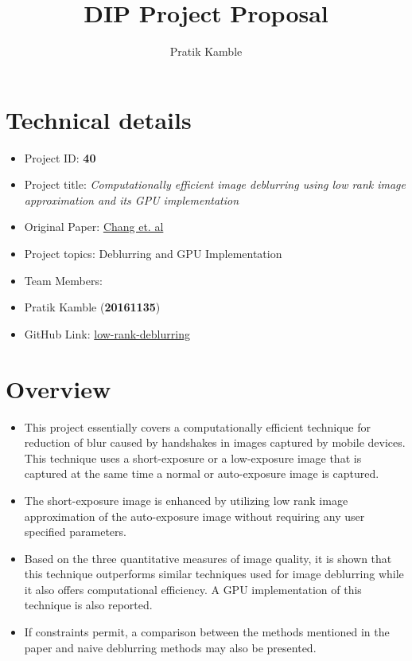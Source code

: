 
\title{DIP Project Proposal}
\author{Pratik Kamble}



\maketitle


\section{Technical details}\label{technical-details}

\begin{itemize}
\tightlist
\item
  Project ID: \textbf{40}
\item
  Project title: \emph{Computationally efficient image deblurring using
  low rank image approximation and its GPU implementation}
\item
  Original Paper:
  \href{https://link.springer.com/content/pdf/10.1007\%2Fs11554-015-0539-x.pdf}{Chang
  et. al}
\item
  Project topics: Deblurring and GPU Implementation
\item
  Team Members:
\item
  Pratik Kamble (\textbf{20161135})
\item
  GitHub Link:
  \href{https://github.com/Pk13055/low-rank-deblurring}{low-rank-deblurring}
\end{itemize}

\section{Overview}\label{overview}

\begin{itemize}
\tightlist
\item
  This project essentially covers a computationally efficient technique
  for reduction of blur caused by handshakes in images captured by
  mobile devices. This technique uses a short-exposure or a low-exposure
  image that is captured at the same time a normal or auto-exposure
  image is captured.
\item
  The short-exposure image is enhanced by utilizing low rank image
  approximation of the auto-exposure image without requiring any user
  specified parameters.
\item
  Based on the three quantitative measures of image quality, it is shown
  that this technique outperforms similar techniques used for image
  deblurring while it also offers computational efficiency. A GPU
  implementation of this technique is also reported.
\item
  If constraints permit, a comparison between the methods mentioned in
  the paper and naive deblurring methods may also be presented.
\end{itemize}


